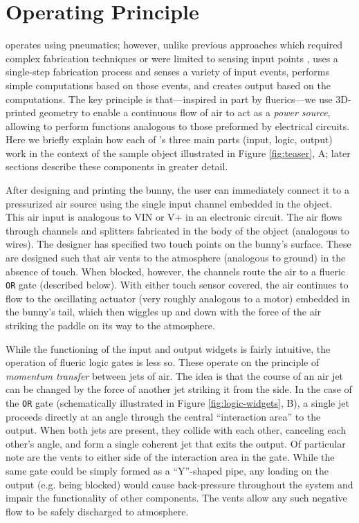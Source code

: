   \section{\al Operating Principle}
    \al operates using pneumatics; however, unlike previous approaches
    which required complex fabrication techniques
    \cite{He:2017,Vazquez:2015,Slyper:2012} or were limited to sensing
    input points \cite{Tejada:2018, Tejada:2020}, \al uses a single-step
    fabrication process and senses a variety of input events, performs
    simple computations based on those events, and creates output based on
    the computations. The key principle is that---inspired in part by
    fluerics---we use 3D-printed geometry to enable a continuous flow of
    air to act as a \textit{power source}, allowing \al to perform
    functions analogous to those preformed by electrical circuits. Here we
    briefly explain how each of \al's three main parts (input, logic,
    output) work in the context of the sample object illustrated in
    Figure \ref{fig:teaser}, A; later sections describe these components in
    greater detail.

    After designing and printing the bunny, the user can immediately
    connect it to a pressurized air source using the single input channel
    embedded in the object. This air input is analogous to VIN or V+ in an
    electronic circuit. The air flows through channels and splitters
    fabricated in the body of the object (analogous to wires). The designer
    has specified two touch points on the bunny's surface. These are
    designed such that air vents to the atmosphere (analogous to ground) in
    the absence of touch. When blocked, however, the channels route the air
    to a flueric \texttt{OR} gate (described below). With either touch
    sensor covered, the air continues to flow to the oscillating actuator
    (very roughly analogous to a motor) embedded in the bunny's tail, which
    then wiggles up and down with the force of the air striking the paddle
    on its way to the atmosphere.

    While the functioning of the input and output widgets is fairly
    intuitive, the operation of flueric logic gates is less so.
    These operate on the principle of \textit{momentum transfer}
    between jets of air. The idea is that the course of an air jet
    can be changed by the force of another jet striking it from the
    side. In the case of the \texttt{OR} gate (schematically
    illustrated in Figure \ref{fig:logic-widgets}, B), a single jet proceeds
    directly at an angle through the central ``interaction area'' to the
    output. When both jets are present, they collide with each other,
    canceling each other's angle, and form a single coherent jet that exits
    the output. Of particular note are the vents to either side of the
    interaction area in the gate. While the same gate could be simply
    formed as a ``Y''-shaped pipe, any loading on the output (e.g. being
    blocked) would cause back-pressure throughout the system and impair the
    functionality of other components. The vents allow any such negative
    flow to be safely discharged to atmosphere.


